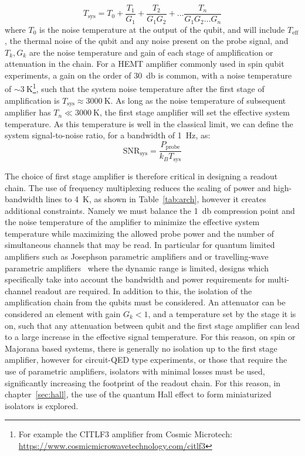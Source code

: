 \begin{equation}
  T_\textrm{sys} = T_{0} + \frac{T_{1}}{G_1} + \frac{T_{2}}{G_1G_2} + \ldots \frac{T_{n}}{G_1G_2 \ldots G_{n}}
\end{equation}
where $T_{0}$ is the noise temperature at the output of the qubit, and will include $T_\textrm{eff}$, the thermal noise of the qubit and any noise present on the
probe signal, and $T_k,G_k$ are the noise temperature and gain of each stage of amplification or attenuation in the chain. For a HEMT amplifier commonly used in
spin qubit experiments, a gain on the order of \SI{30}{\decibel} is common, with a noise temperature of $\sim \SI{3}{\kelvin}$\footnote{For example the CITLF3 amplifier
from Cosmic Microtech: \url{https://www.cosmicmicrowavetechnology.com/citlf3}}, such that the system noise temperature after the first stage of amplification
is $T_\textrm{sys} \approx \SI{3000}{\kelvin}$. As long as the noise temperature of subsequent amplifier has $T_n \ll \SI{3000}{\kelvin}$, the first stage amplifier
will set the effective system temperature. As this temperature is well in the classical limit, we can define the system signal-to-noise ratio,
for a bandwidth of \SI{1}{\hertz}, as:
\begin{equation}
  \textrm{SNR}_\textrm{sys} = \frac{P_\textrm{probe}}{k_B T_\textrm{sys}}
  \label{eq:r_snr}
\end{equation}

The choice of first stage amplifier is therefore critical in designing a readout chain. The use of frequency multiplexing reduces the scaling of power and high-bandwidth
lines to \SI{4}{\kelvin}, as shown in Table~\ref{tab:arch}, however it creates additional constraints. Namely we must balance the \SI{1}{\decibel} compression point and
the noise temperature of the amplifier to minimize the effective system temperature while maximizing the allowed probe power and the number of simultaneous channels that
may be read. In particular for quantum limited amplifiers such as Josephson parametric amplifiers and or travelling-wave parametric amplifiers~\cite{Macklin307}
where the dynamic range is limited, designs which specifically take into account the bandwidth and power requirements for multi-channel readout are required. In addition
to this, the isolation of the amplification chain from the qubits must be considered. An attenuator can be considered an element with gain $G_k < 1$, and a temperature
set by the stage it is on, such that any attenuation between qubit and the first stage amplifier can lead to a large increase in the effective signal temperature. For this
reason, on spin or Majorana based systems, there is generally no isolation up to the first stage amplifier, however for circuit-QED type experiments, or those that require
the use of parametric amplifiers, isolators with minimal losses must be used, significantly increasing the footprint of the readout chain. For this reason, in
chapter~\ref{sec:hall}, the use of the quantum Hall effect to form miniaturized isolators is explored.

